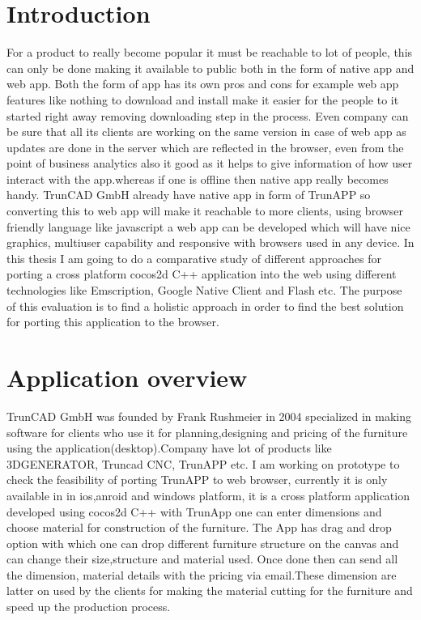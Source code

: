 \documentclass[23pt]{article}
\begin{document}
\newpage


\setcounter{secnumdepth}{3}


\section{Introduction }

{\Large For a product to really become popular it must be reachable to lot of people, this can only be done making it available to public both in the form of native app and web app. Both the form of app has its own pros and cons for example web app features like nothing to download and install make it easier for the people to it started right away removing downloading step in the process. Even company can be sure that all its clients are working on the same version in case of web app as updates are done in the server which are reflected in the browser, even from the point of business analytics also it good as it helps to give information of how user interact with the app.whereas if one is offline then native app really becomes handy. TrunCAD GmbH already have native app in form of TrunAPP so converting this to web app will make it reachable to more clients, using browser friendly language like javascript a web app can be developed which will have nice graphics, multiuser capability and  responsive with browsers used in any device. In this thesis I am going to do a comparative study of different approaches for porting a cross platform cocos2d C++ application into the web  using different technologies like Emscription, Google Native Client and Flash etc. The purpose of this evaluation is to find a holistic approach in order to find the best solution for porting this application to the browser.
 \par}

\newpage

\section{Application overview}

{\Large TrunCAD GmbH was founded by Frank Rushmeier in 2004 specialized in making software for clients who use it for planning,designing and pricing of the furniture using the application(desktop).Company have lot of products like 3DGENERATOR, Truncad CNC, TrunAPP etc. I  am working on prototype to check the feasibility of porting TrunAPP to web browser, currently it is only available in in ios,anroid and windows platform, it is a cross platform application developed using cocos2d C++  with TrunApp one can enter dimensions and choose material for construction of the furniture. The App  has drag and drop option with which one can drop different furniture structure on the canvas and can change their size,structure and material used. Once done then can send all the dimension, material details with the pricing via email.These dimension are latter on used by the clients for making the material cutting for the furniture and speed up the production process.\cite{truncad} \par}
\end{document}
